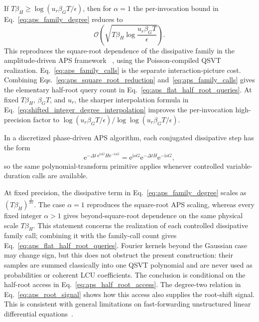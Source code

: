 \documentclass[aps,pra,reprint,floatfix,unsortedaddress,superscriptaddress]{revtex4-2}
\newcommand{\Ocal}{\mathcal{O}}
\begin{document}
If
$T\beta_H\geq\log(u_r\beta_G T/\epsilon)$, then for $\alpha=1$
the per-invocation bound in Eq.~\eqref{eq:aps_family_degree} reduces to
\begin{equation}
\Ocal\!\left(
\sqrt{T\beta_H\log\frac{u_r\beta_G T}{\epsilon}}
\right).
\label{eq:aps_square_root_reduction}
\end{equation}
This reproduces the square-root dependence of the dissipative family in
the amplitude-driven APS framework
~\cite{hu2026quantumsimulationnonunitarydynamics}, using the
Poisson-compiled QSVT realization.  Eq.~\eqref{eq:aps_family_calls} is the separate interaction-picture cost.
Combining Eqs.~\eqref{eq:aps_square_root_reduction}
and~\eqref{eq:aps_family_calls} gives the elementary half-root query
count in Eq.~\eqref{eq:aps_flat_half_root_queries}.  At fixed $T\beta_H$,
$\beta_G T$, and $u_r$, the sharper interpolation formula in
Eq.~\eqref{eq:shifted_integer_degree_interpolation} improves the
per-invocation high-precision factor to
$\log(u_r\beta_G T/\epsilon)/\log\log(u_r\beta_G T/\epsilon)$.

In a discretized phase-driven APS
algorithm, each conjugated dissipative step has the form
\begin{equation}
    \mathrm e^{-\Delta t\,
    \mathrm e^{\mathrm isG}H\mathrm e^{-\mathrm isG}}
    =
    \mathrm e^{\mathrm isG}
    \mathrm e^{-\Delta t H}
    \mathrm e^{-\mathrm isG},
    \label{eq:aps_conjugated_step}
\end{equation}
so the same polynomial-transform primitive applies whenever controlled
variable-duration calls are available.

At fixed precision, the dissipative term in
Eq.~\eqref{eq:aps_family_degree} scales as
$(T\beta_H)^{\frac{1}{2\alpha}}$.  The case $\alpha=1$ reproduces the
square-root APS scaling, whereas every fixed integer $\alpha>1$ gives
beyond-square-root dependence on the same physical scale $T\beta_H$.
This statement concerns the realization of each controlled dissipative
family call; combining it with the family-call count gives
Eq.~\eqref{eq:aps_flat_half_root_queries}.  Fourier kernels beyond the
Gaussian case may change sign, but this does not obstruct the present
construction: their samples are summed classically into one QSVT
polynomial and are never used as probabilities or coherent LCU
coefficients.  The conclusion is conditional on the half-root access in
Eq.~\eqref{eq:aps_half_root_access}.  The degree-two relation in
Eq.~\eqref{eq:aps_root_signal} shows how this access also supplies the
root-shift signal.  This is consistent with general
limitations on fast-forwarding unstructured linear differential
equations~\cite{An2025qq}.
\end{document}
